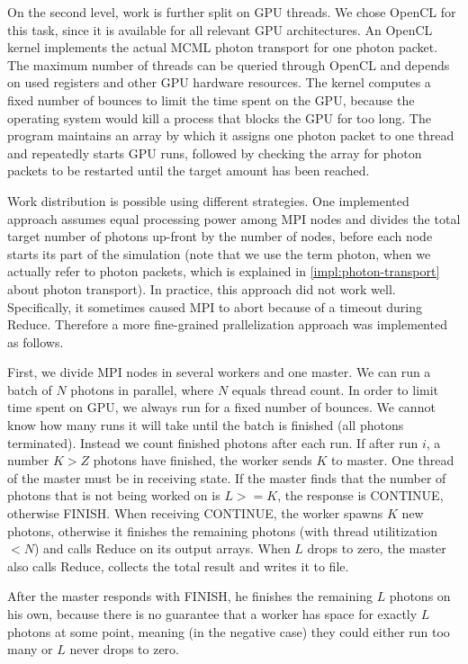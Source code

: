 \documentclass[]{article}
\begin{document}
On the second level, work is further split on GPU threads. We chose OpenCL for this task, since it is available for all relevant GPU architectures. An OpenCL kernel implements the actual MCML photon transport for one photon packet. The maximum number of threads can be queried through OpenCL and depends on used registers and other GPU hardware resources. The kernel computes a fixed number of bounces to limit the time spent on the GPU, because the operating system would kill a process that blocks the GPU for too long. The program maintains an array by which it assigns one photon packet to one thread and repeatedly starts GPU runs, followed by checking the array for photon packets to be restarted until the target amount has been reached.

Work distribution is possible using different strategies. One implemented approach assumes equal processing power among MPI nodes and divides the total target number of photons up-front by the number of nodes, before each node starts its part of the simulation (note that we use the term photon, when we actually refer to photon packets, which is explained in \autoref{impl:photon-transport} about photon transport). In practice, this approach did not work well. Specifically, it sometimes caused MPI to abort because of a timeout during Reduce. Therefore a more fine-grained prallelization approach was implemented as follows.

First, we divide MPI nodes in several workers and one master. We can run a batch of $N$ photons in parallel, where $N$ equals thread count. In order to limit time spent on GPU, we always run for a fixed number of bounces. We cannot know how many runs it will take until the batch is finished (all photons terminated). Instead we count finished photons after each run. If after run $i$, a number $K > Z$ photons have finished, the worker sends $K$ to master. One thread of the master must be in receiving state. If the master finds that the number of photons that is not being worked on is $L >= K$, the response is CONTINUE, otherwise FINISH. When receiving CONTINUE, the worker spawns $K$ new photons, otherwise it finishes the remaining photons (with thread utilitization $< N$) and calls Reduce on its output arrays. When $L$ drops to zero, the master also calls Reduce, collects the total result and writes it to file.

After the master responds with FINISH, he finishes the remaining $L$ photons on his own, because there is no guarantee that a worker has space for exactly $L$ photons at some point, meaning (in the negative case) they could either run too many or $L$ never drops to zero.
\end{document}
